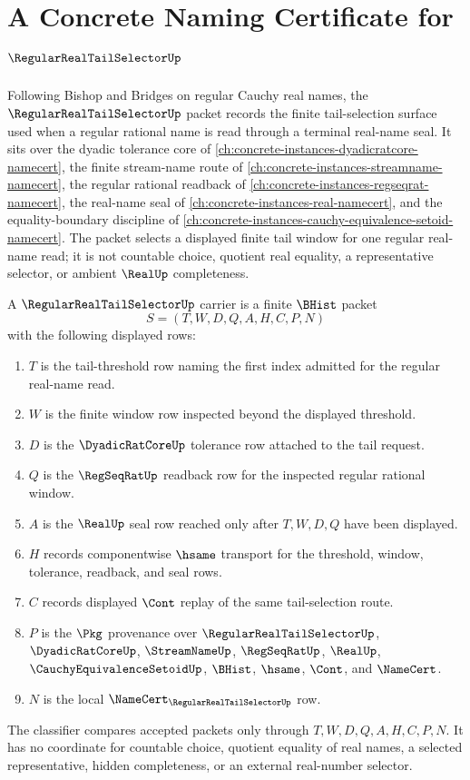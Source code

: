 \chapter{A Concrete Naming Certificate for $\RegularRealTailSelectorUp$}
\label{ch:concrete-instances-regular-real-tail-selector-namecert}

Following Bishop and Bridges on regular Cauchy real names, the $\RegularRealTailSelectorUp$ packet records the finite tail-selection surface used when a regular rational name is read through a terminal real-name seal. It sits over the dyadic tolerance core of \autoref{ch:concrete-instances-dyadicratcore-namecert}, the finite stream-name route of \autoref{ch:concrete-instances-streamname-namecert}, the regular rational readback of \autoref{ch:concrete-instances-regseqrat-namecert}, the real-name seal of \autoref{ch:concrete-instances-real-namecert}, and the equality-boundary discipline of \autoref{ch:concrete-instances-cauchy-equivalence-setoid-namecert}. The packet selects a displayed finite tail window for one regular real-name read; it is not countable choice, quotient real equality, a representative selector, or ambient $\RealUp$ completeness.

\begin{definition}
\label{def:regular-real-tail-selector-carrier}
A $\RegularRealTailSelectorUp$ carrier is a finite $\BHist$ packet
$$
S=(T,W,D,Q,A,H,C,P,N)
$$
with the following displayed rows:
\begin{enumerate}
\item $T$ is the tail-threshold row naming the first index admitted for the regular real-name read.
\item $W$ is the finite window row inspected beyond the displayed threshold.
\item $D$ is the $\DyadicRatCoreUp$ tolerance row attached to the tail request.
\item $Q$ is the $\RegSeqRatUp$ readback row for the inspected regular rational window.
\item $A$ is the $\RealUp$ seal row reached only after $T,W,D,Q$ have been displayed.
\item $H$ records componentwise $\hsame$ transport for the threshold, window, tolerance, readback, and seal rows.
\item $C$ records displayed $\Cont$ replay of the same tail-selection route.
\item $P$ is the $\Pkg$ provenance over $\RegularRealTailSelectorUp$, $\DyadicRatCoreUp$, $\StreamNameUp$, $\RegSeqRatUp$, $\RealUp$, $\CauchyEquivalenceSetoidUp$, $\BHist$, $\hsame$, $\Cont$, and $\NameCert$.
\item $N$ is the local $\NameCert_{\RegularRealTailSelectorUp}$ row.
\end{enumerate}
The classifier compares accepted packets only through $T,W,D,Q,A,H,C,P,N$. It has no coordinate for countable choice, quotient equality of real names, a selected representative, hidden completeness, or an external real-number selector.
\end{definition}

